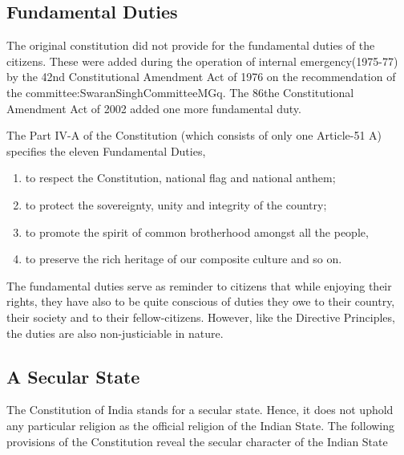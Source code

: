 \subsection{Fundamental Duties}

The original constitution did not provide for the fundamental duties of the citizens. These were added during the operation of internal emergency(1975-77) by the 42nd Constitutional Amendment Act of 1976 on the recommendation of the \gls{committee:SwaranSinghCommitteeMGq}. The 86the Constitutional Amendment Act of 2002 added one more fundamental duty.

The Part IV-A of the Constitution (which consists of only one Article-51 A) specifies the eleven Fundamental Duties,

\renewcommand{\labelenumi}{\textbf{(\alph{enumi})}}
\begin{enumerate}
  \item to respect the Constitution, national flag and national anthem;
  \item to protect the sovereignty, unity and integrity of the country;
  \item to promote the spirit of common brotherhood amongst all the people,
  \item to preserve the rich heritage of our composite culture and so on.
\end{enumerate}

The fundamental duties serve as reminder to citizens that while enjoying their rights, they have also to be quite conscious of duties they owe to their country, their society and to their fellow-citizens. However, like the Directive Principles, the duties are also non-justiciable in nature.


\subsection{A Secular State}

The Constitution of India stands for a secular state. Hence, it does not uphold any particular religion as the official religion of the Indian State. The following provisions of the Constitution reveal the secular character of the Indian State

